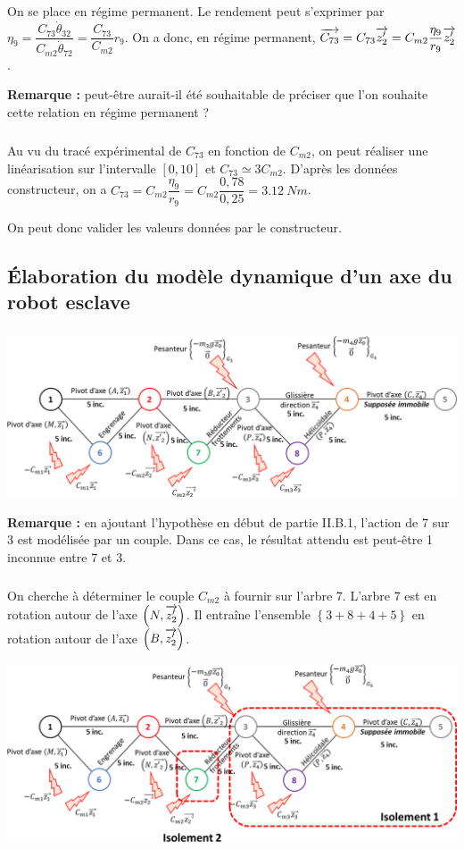 \documentclass[10pt,fleqn]{article} %
\begin{document}
\subparagraph{}%
On se place en régime permanent. Le rendement peut s'exprimer par 
$\eta_9 =\dfrac{C_{73}\dot{\theta}_{32}}{C_{m2}\dot{\theta}_{72}}=\dfrac{C_{73}}{C_{m2}}r_9$. 
On a donc, en régime permanent, $\overrightarrow{C_{73}}=C_{73}\overrightarrow{z'_2}=C_{m2}\dfrac{\eta_9}{r_9}\overrightarrow{z'_2}$.


\textbf{Remarque :} peut-être aurait-il été souhaitable de préciser que l'on souhaite cette relation en régime permanent ?


\subparagraph{}%
Au vu du tracé expérimental de $C_{73}$ en fonction de $C_{m2}$, on peut réaliser une linéarisation sur l'intervalle $[0,10]$ et $C_{73}\simeq 3 C_{m2}$. 
D'après les données constructeur, on a $C_{73}=C_{m2}\dfrac{\eta_9}{r_9}=C_{m2}\dfrac{0,78}{0,25}=\SI{3,12}{Nm}$.

On peut donc valider les valeurs données par le constructeur.
\subsection{Élaboration du modèle dynamique d’un axe du robot esclave}


\subparagraph{}%
\begin{center}
\includegraphics[width=\textwidth]{images/fig_02}
\end{center}

\textbf{Remarque :} en ajoutant l'hypothèse en début de partie II.B.1, l'action de 7 sur 3 est modélisée par un couple. Dans ce cas, le résultat attendu est peut-être 1 inconnue entre 7 et 3.
%
\subparagraph{}%
On cherche à déterminer le couple $C_{m2}$ à fournir sur l'arbre 7. L'arbre 7 est en rotation autour de l'axe $\left(N,\overrightarrow{z_2'}\right)$. Il entraîne l'ensemble $\left\{3+8+4+5\right\}$ en rotation autour de l'axe $\left(B,\overrightarrow{z_2'}\right)$.

\begin{center}
\includegraphics[width=\textwidth]{images/fig_05}
\end{center}
\end{document}
